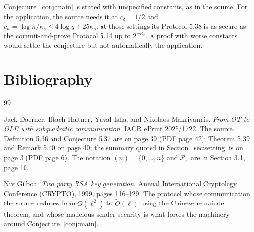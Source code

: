 \documentclass{aicr-conjecture}
\newcommand{\Prm}{\mathcal{P}}
\begin{document}
\begin{remark}
Conjecture~\ref{conj:main} is stated with unspecified constants, as in
the source. For the application, the source needs it at $c_{\delta} =
1/2$ and $c_{n} = \log n / \kappa_{s} \le 4 \log q + 25 \kappa_{s}$; at
those settings its Protocol 5.38 is as secure as the commit-and-prove
Protocol 5.14 up to $2^{-\kappa_{s}}$. A proof with worse constants
would settle the conjecture but not automatically the application.
\end{remark}

\section{Bibliography}

\begin{aicrbibliography}{99}

Jack Doerner, Iftach Haitner, Yuval Ishai and Nikolaos Makriyannis.
\emph{From OT to OLE with subquadratic communication}.
IACR ePrint 2025/1722.
The source. Definition 5.36 and Conjecture 5.37 are on page 39 (PDF page
42); Theorem 5.39 and Remark 5.40 on page 40; the summary quoted in
Section~\ref{sec:setting} is on page 3 (PDF page 6). The notation $(n) =
\{0,\dots,n\}$ and $\Prm_{\kappa}$ are in Section 3.1, page 10.

Niv Gilboa.
\emph{Two party RSA key generation}.
Annual International Cryptology Conference (CRYPTO), 1999, pages
116--129.
The protocol whose communication the source reduces from $O(\ell^{2})$
to $\widetilde{O}(\ell)$ using the Chinese remainder theorem, and whose
malicious-sender security is what forces the machinery around
Conjecture~\ref{conj:main}.

\end{aicrbibliography}
\end{document}
